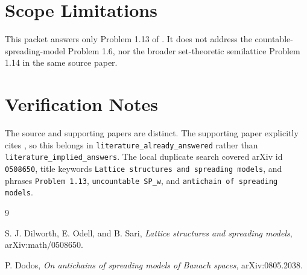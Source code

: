 \documentclass[11pt]{article}
\begin{document}
\section*{Scope Limitations}

This packet answers only Problem 1.13 of \cite{DOS}. It does not address the
countable-spreading-model Problem 1.6, nor the broader set-theoretic
semilattice Problem 1.14 in the same source paper.

\section*{Verification Notes}

The source and supporting papers are distinct. The supporting paper explicitly
cites \cite[Problem 1.13]{DOS}, so this belongs in
\texttt{literature\_already\_answered} rather than
\texttt{literature\_implied\_answers}. The local duplicate search covered
arXiv id \texttt{0508650}, title keywords \texttt{Lattice structures and
spreading models}, and phrases \texttt{Problem 1.13}, \texttt{uncountable
SP\_w}, and \texttt{antichain of spreading models}.

\begin{thebibliography}{9}

S. J. Dilworth, E. Odell, and B. Sari,
\emph{Lattice structures and spreading models},
arXiv:math/0508650.

P. Dodos,
\emph{On antichains of spreading models of Banach spaces},
arXiv:0805.2038.

\end{thebibliography}
\end{document}
